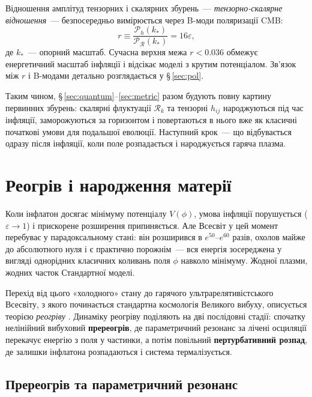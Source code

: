 \documentclass[12pt, a4paper]{article}
\begin{document}
Відношення амплітуд тензорних і скалярних збурень~---
\emph{тензорно-скалярне відношення}~--- безпосередньо
вимірюється через B-моди поляризації CMB:
\begin{equation}\label{eq:tensor_scalar_ratio}
  r \equiv \frac{\mathcal{P}_h(k_*)}
               {\mathcal{P}_{\mathcal{R}}(k_*)}
    = 16\varepsilon,
\end{equation}
де $k_*$~--- опорний масштаб. Сучасна верхня межа
$r < 0.036$ \cite{bicep_keck_2021} обмежує енергетичний
масштаб інфляції і відсікає моделі з крутим потенціалом.
Зв'язок між $r$ і B-модами детально розглядається у
§\,\ref{sec:pol}.

Таким чином, §\,\ref{sec:quantum}–\ref{sec:metric} разом
будують повну картину первинних збурень: скалярні флуктуації
$\mathcal{R}_k$ та тензорні $h_{ij}$ народжуються під час
інфляції, заморожуються за горизонтом і повертаються в нього
вже як класичні початкові умови для подальшої еволюції.
Наступний крок~--- що відбувається одразу після інфляції,
коли поле розпадається і народжується гаряча плазма.


\section{Реогрів і народження матерії}
\label{sec:reheating}

Коли інфлатон досягає мінімуму потенціалу $V(\phi)$, умова
інфляції порушується ($\varepsilon \to 1$) і прискорене
розширення припиняється. Але Всесвіт у цей момент
перебуває у парадоксальному стані: він розширився в
$e^{50}$--$e^{60}$ разів, охолов майже до абсолютного нуля
і є практично порожнім~--- вся енергія зосереджена у
вигляді однорідних класичних коливань поля $\phi$ навколо
мінімуму. Жодної плазми, жодних часток Стандартної моделі.

Перехід від цього «холодного» стану до гарячого
ультрарелятивістського Всесвіту, з якого починається
стандартна космологія Великого вибуху, описується теорією
\emph{реогріву} \cite{linde_1982, albrecht_1982}. Динаміку
реогріву поділяють на дві послідовні стадії: спочатку
нелінійний вибуховий \textbf{пререогрів}, де параметричний
резонанс за лічені осциляції перекачує енергію з поля у
частинки, а потім повільний \textbf{пертурбативний розпад},
де залишки інфлатона розпадаються і система термалізується.

\subsection{Пререогрів та параметричний резонанс}
\end{document}
